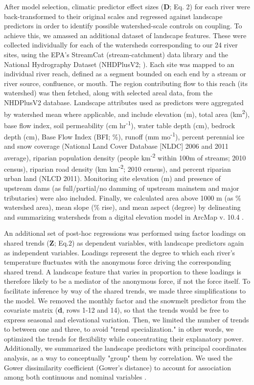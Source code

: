 \documentclass[notitlepage]{article}
\begin{document}
After model selection, climatic predictor effect sizes (\textbf{D}; Eq. 2) for each river were back-transformed to their original scales and regressed against landscape predictors in order to identify possible watershed-scale controls on coupling. To achieve this, we amassed an additional dataset of landscape features. These were collected individually for each of the watersheds corresponding to our 24 river sites, using the EPA's StreamCat (stream-catchment) data library \citep{hill2016stream} and the National Hydrography Dataset (NHDPlusV2; \citealt{mckay2012nhdplus}). Each site was mapped to an individual river reach, defined as a segment bounded on each end by a stream or river source, confluence, or mouth. The region contributing flow to this reach (its watershed) was then fetched, along with selected areal data, from the NHDPlusV2 database. Landscape attributes used as predictors were aggregated by watershed mean where applicable, and include elevation (m), total area (km\textsuperscript{2}), base flow index, soil permeability (cm hr\textsuperscript{-1}), water table depth (cm), bedrock depth (cm), Base Flow Index (BFI; \%), runoff (mm mo\textsuperscript{-1}), percent perennial ice and snow coverage (National Land Cover Database [NLDC] 2006 and 2011 average), riparian population density (people km\textsuperscript{-2} within 100m of streams; 2010 census), riparian road density (km km\textsuperscript{-2}; 2010 census), and percent riparian urban land (NLCD 2011). Monitoring site elevation (m) and presence of upstream dams (as full/partial/no damming of upstream mainstem and major tributaries) were also included. Finally, we calculated area above 1000 m (as \% watershed area), mean slope (\% rise), and mean aspect (degree) by delineating and summarizing watersheds from a digital elevation model in ArcMap v. 10.4 \citep{arcviewenvironmental}.

An additional set of post-hoc regressions was performed using factor loadings on shared trends (\textbf{Z}; Eq.2) as dependent variables, with landscape predictors again as independent variables. Loadings represent the degree to which each river's temperature fluctuates with the anonymous force driving the corresponding shared trend. A landscape feature that varies in proportion to these loadings is therefore likely to be a mediator of the anonymous force, if not the force itself. To facilitate inference by way of the shared trends, we made three simplifications to the model. We removed the monthly factor and the snowmelt predictor from the covariate matrix (\textbf{d}, rows 1-12 and 14), so that the trends would be free to express seasonal and elevational variation. Then, we  limited the number of trends to between one and three, to avoid "trend specialization." in other words, we optimized the trends for flexibility while concentrating their explanatory power. Additionally, we summarized the landscape predictors with principal coordinates analysis, as a way to conceptually "group" them by correlation. We used the Gower dissimilarity coefficient (Gower's distance) to account for association among both continuous and nominal variables \citep{gowerDist}.
\end{document}
